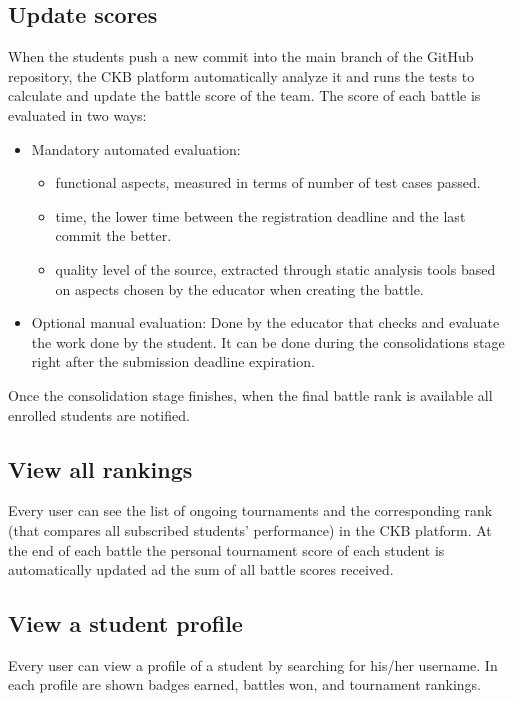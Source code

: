 \subsection{Update scores}
When the students push a new commit into the main branch of the GitHub repository, the CKB platform automatically analyze it and runs the tests to calculate and update the battle score of the team.\newline
The score of each battle is evaluated in two ways:
\begin{itemize}
    \item Mandatory automated evaluation:
        \begin{itemize}
            \item functional aspects, measured in terms of number of test cases passed.
            \item time, the lower time between the registration deadline and the last commit the better.
            \item quality level of the source, extracted through static analysis tools based on aspects chosen by the educator when creating the battle.
        \end{itemize}
    \item Optional manual evaluation:
        Done by the educator that checks and evaluate the work done by the student. It can be done during the consolidations stage right after the submission deadline expiration.
\end{itemize}
Once the consolidation stage finishes, when the final battle rank is available all enrolled students are notified.

\subsection{View all rankings}
Every user can see the list of ongoing tournaments and the corresponding rank (that compares all subscribed students' performance) in the CKB platform.
At the end of each battle the personal tournament score of each student is automatically updated ad the sum of all battle scores received. 

\subsection{View a student profile}
Every user can view a profile of a student by searching for his/her username. In each profile are shown badges earned, battles won, and tournament rankings. 

